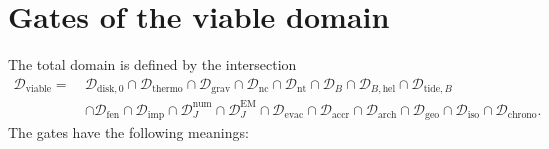 \documentclass[11pt,a4paper,openany]{report}
\begin{document}
\section{Gates of the viable domain}

The total domain is defined by the intersection
\begin{equation}
\boxed{\begin{aligned}
\mathcal{D}_{\mathrm{viable}}=\ &\mathcal{D}_{\mathrm{disk},0}\cap\mathcal{D}_{\mathrm{thermo}}
\cap\mathcal{D}_{\mathrm{grav}}\cap\mathcal{D}_{\mathrm{nc}}\cap\mathcal{D}_{\mathrm{nt}}
\cap\mathcal{D}_{B}\cap\mathcal{D}_{B,\mathrm{hel}}\cap\mathcal{D}_{\mathrm{tide},B}\\
&\cap\mathcal{D}_{\mathrm{fen}}\cap\mathcal{D}_{\mathrm{imp}}
\cap\mathcal{D}_{J}^{\mathrm{num}}\cap\mathcal{D}_{J}^{\mathrm{EM}}\cap\mathcal{D}_{\mathrm{evac}}
\cap\mathcal{D}_{\mathrm{accr}}\cap\mathcal{D}_{\mathrm{arch}}
\cap\mathcal{D}_{\mathrm{geo}}\cap\mathcal{D}_{\mathrm{iso}}\cap\mathcal{D}_{\mathrm{chrono}}.
\end{aligned}}
\label{eq:Dviable}
\end{equation}
The gates have the following meanings:
\end{document}
